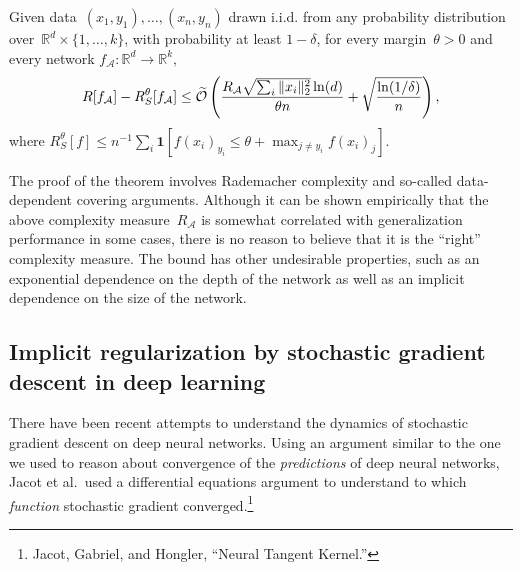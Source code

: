 \documentclass{tufte-book}
\begin{document}
\begin{Theorem}

Given data~\((x_1,y_1),\dots,(x_n,y_n)\) drawn i.i.d. from any
probability distribution over~\(\mathbb{R}^d\times\{1,\ldots,k\}\), with
probability at least \(1-\delta\), for every margin~\(\theta > 0\) and
every network \(f_{\mathcal{A}} \colon \mathbb{R}^d \to \mathbb{R}^k,\)
\begin{align*}     R[f_{\mathcal{A}}]- R_S^{\theta}[f_{\mathcal{A}}]     \leq \widetilde{{\cal O}}     \left( \frac {R_{\mathcal{A}}\sqrt{ \sum_i \|x_i\|_2^2 }\ln(d)}{\theta n} + \sqrt{\frac {\ln(1/\delta)}{n}} \right),    \end{align*}
where
\(R_S^{\theta}[f] \leq n^{-1} \sum_i \mathbf{1}\left[ f(x_i)_{y_i} \leq \theta + \max_{j\neq y_i} f(x_i)_j \right]\).

\end{Theorem}

The proof of the theorem involves Rademacher complexity and so-called
data-dependent covering arguments. Although it can be shown empirically
that the above complexity measure~\(R_{\mathcal{A}}\) is somewhat
correlated with generalization performance in some cases, there is no
reason to believe that it is the ``right'' complexity measure. The bound
has other undesirable properties, such as an exponential dependence on
the depth of the network as well as an implicit dependence on the size
of the network.

\hypertarget{implicit-regularization-by-stochastic-gradient-descent-in-deep-learning}{%
\subsection{Implicit regularization by stochastic gradient descent in
deep
learning}\label{implicit-regularization-by-stochastic-gradient-descent-in-deep-learning}}

There have been recent attempts to understand the dynamics of stochastic
gradient descent on deep neural networks. Using an argument similar to
the one we used to reason about convergence of the \emph{predictions} of
deep neural networks, Jacot et al.~used a differential equations
argument to understand to which \emph{function} stochastic gradient
converged.\footnote{Jacot, Gabriel, and Hongler, {``Neural Tangent
  Kernel.''}}
\end{document}
